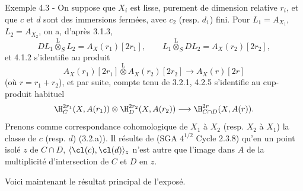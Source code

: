 \begin{statement}{Exemple 4.3 -}
On suppose que $X_i$ est lisse, purement de dimension relative $r_i$, et que $c$ et $d$ sont des immersions fermées, avec $c_2$ (resp. $d_1$) fini. Pour $L_1=A_{X_1}$, $L_2=A_{X_2}$, on a, d'après 3.1.3,
\[
DL_1\overset{\mathrm{L}}{\otimes}_SL_2=A_X(r_1)[2r_1],\qquad
L_1\overset{\mathrm{L}}{\otimes}_SDL_2=A_X(r_2)[2r_2],
\]
et 4.1.2 s'identifie au produit
\[
A_X(r_1)[2r_1]\overset{\mathrm{L}}{\otimes}A_X(r_2)[2r_2]\longrightarrow A_X(r)[2r]
\]
(où $r=r_1+r_2$), et par suite, compte tenu de 3.2.1, 4.2.5 s'identifie au cup-produit habituel
\[
\H_C^{2r_1}(X,A(r_1))\otimes \H_D^{2r_2}(X,A(r_2))
\longrightarrow
\H_{C\cap D}^{2r}(X,A(r)).
\]
Prenons comme correspondance cohomologique de $X_1$ à $X_2$ (resp. $X_2$ à $X_1$) la classe de $c$ (resp. $d$) (3.2.a)). Il résulte de (SGA $4^{1/2}$ Cycle 2.3.8) qu'en un point isolé 
$z$ de $C\cap D$, $\langle \cl(c),\cl(d)\rangle_z$ n'est
autre que l'image dans $A$ de la multiplicité d'intersection de $C$ et $D$ en $z$.
\end{statement}

Voici maintenant le résultat principal de l'exposé.


